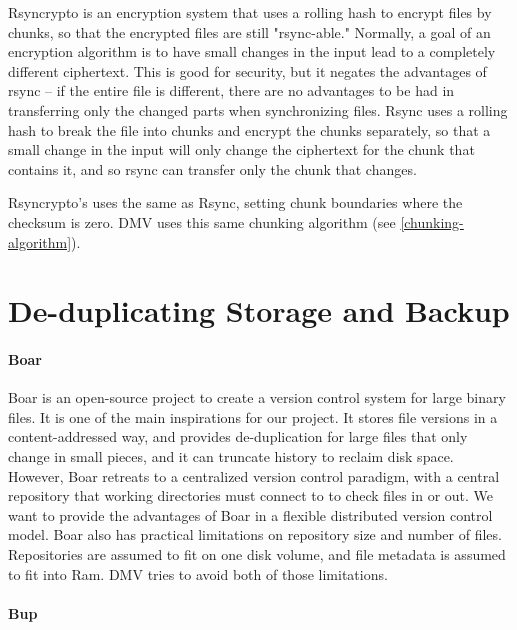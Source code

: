 Rsyncrypto\cite{rsyncrypto_algorithm} is an encryption system that uses a
rolling hash to encrypt files by chunks, so that the encrypted files are still
"rsync-able." Normally, a goal of an encryption algorithm is to have small
changes in the input lead to a completely different ciphertext. This is good for
security, but it negates the advantages of rsync -- if the entire file is
different, there are no advantages to be had in transferring only the changed
parts when synchronizing files. Rsync uses a rolling hash to break the file into
chunks and encrypt the chunks separately, so that a small change in the input
will only change the ciphertext for the chunk that contains it, and so rsync can
transfer only the chunk that changes.

Rsyncrypto's uses the same  as
Rsync\cite{rsyncrypto_algorithm,rsynctechreport}, setting chunk boundaries where
the checksum is zero. \gls{DMV} uses this same chunking algorithm (see
\autoref{chunking-algorithm}).


\section{De-duplicating Storage and Backup}

\paragraph{Boar}

Boar \cite{boar_homepage} is an open-source project to create a version control
system for large binary files. It is one of the main inspirations for our
project. It stores file versions in a content-addressed way, and provides
de-duplication for large files that only change in small pieces, and it can
truncate history to reclaim disk space. However, Boar retreats to a centralized
version control paradigm, with a central repository that working directories
must connect to to check files in or out. We want to provide the advantages of
Boar in a flexible distributed version control model. Boar also has practical
limitations on repository size and number of files. Repositories are assumed to
fit on one disk volume, and file metadata is assumed to fit into Ram. \gls{DMV}
tries to avoid both of those limitations.


\paragraph{Bup}\label{related_bup}

